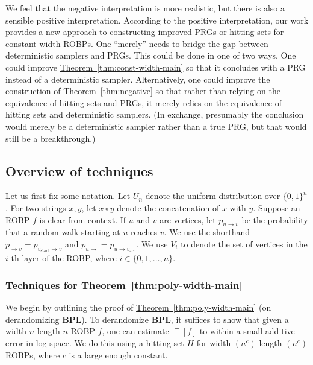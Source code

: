 \documentclass[11pt]{article}
\numberwithin{equation}{section}
\theoremstyle{definition}
\theoremstyle{plain}
\newcommand{\expref}[2]{\hyperref[#2]{#1~\ref{#2}}}
\DeclareMathOperator*{\ExpVal}{\mathbb{E}}
\begin{document}
We feel that the negative interpretation is more realistic, but there is also a sensible positive interpretation. According to the positive interpretation, our work provides a new approach to constructing improved PRGs or hitting sets for constant-width ROBPs. One ``merely'' needs to bridge the gap between deterministic samplers and PRGs. This could be done in one of two ways. One could improve \expref{Theorem}{thm:const-width-main} so that it concludes with a PRG instead of a deterministic sampler. Alternatively, one could improve the construction of \expref{Theorem}{thm:negative} so that rather than relying on the equivalence of hitting sets and PRGs, it merely relies on the equivalence of hitting sets and deterministic samplers. (In exchange, presumably the conclusion would merely be a deterministic sampler rather than a true PRG, but that would still be a breakthrough.)


\subsection{Overview of techniques}

Let us first fix some notation. Let $U_n$ denote the uniform distribution over $\{0, 1\}^n$. For two strings $x, y$, let $x \circ y$ denote the concatenation of $x$ with $y$. 
Suppose an ROBP $f$ is clear from context. If $u$ and $v$ are vertices, let $p_{u \to v}$ be the probability that a random walk starting at $u$ reaches $v$. We use the shorthand $p_{\to v} = p_{v_{\text{start}} \to v}$ and $p_{u \to} = p_{u \to v_{\text{acc}}}$. We use $V_i$ to denote the set of vertices in the $i$-th layer of the ROBP, where $i \in \{0, 1, \dots, n\}$.


\subsubsection{Techniques for \expref{Theorem}{thm:poly-width-main}} \label{sec:poly-width-techniques}

We begin by outlining the proof of \expref{Theorem}{thm:poly-width-main} (on derandomizing $\mathbf{BPL}$). To derandomize $\mathbf{BPL}$, it suffices to show that given a width-$n$ length-$n$ ROBP $f$, one can estimate $\ExpVal[f]$ to within a small additive error in log space. We do this using a hitting set $H$ for width-$(n^c)$ length-$(n^c)$ ROBPs, where $c$ is a large enough constant.
\end{document}
